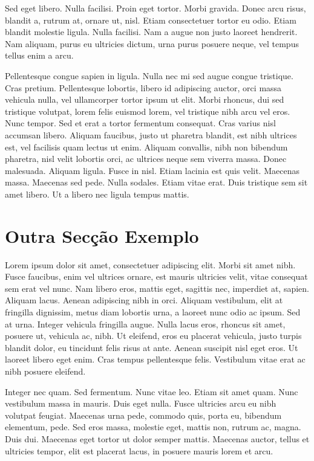 Sed eget libero. Nulla facilisi. Proin eget tortor. Morbi
gravida. Donec arcu risus, blandit a, rutrum at, ornare ut,
nisl. Etiam consectetuer tortor eu odio. Etiam blandit molestie
ligula. Nulla facilisi. Nam a augue non justo laoreet hendrerit. Nam
aliquam, purus eu ultricies dictum, urna purus posuere neque, vel
tempus tellus enim a arcu. 

Pellentesque congue sapien in ligula. Nulla nec mi sed augue congue
tristique. Cras pretium. Pellentesque lobortis, libero id adipiscing
auctor, orci massa vehicula nulla, vel ullamcorper tortor ipsum ut
elit. Morbi rhoncus, dui sed tristique volutpat, lorem felis euismod
lorem, vel tristique nibh arcu vel eros. Nunc tempor. Sed et erat a
tortor fermentum consequat. Cras varius nisl accumsan libero. Aliquam
faucibus, justo ut pharetra blandit, est nibh ultrices est, vel
facilisis quam lectus ut enim. Aliquam convallis, nibh non bibendum
pharetra, nisl velit lobortis orci, ac ultrices neque sem viverra
massa. Donec malesuada. Aliquam ligula. Fusce in nisl. Etiam lacinia
est quis velit. Maecenas massa. Maecenas sed pede. Nulla
sodales. Etiam vitae erat. Duis tristique sem sit amet libero. Ut a
libero nec ligula tempus mattis. 

\section{Outra Secção Exemplo} \label{sec:goals}

Lorem ipsum dolor sit amet, consectetuer adipiscing elit. Morbi sit
amet nibh. Fusce faucibus, enim vel ultrices ornare, est mauris
ultricies velit, vitae consequat sem erat vel nunc. Nam libero eros,
mattis eget, sagittis nec, imperdiet at, sapien. Aliquam lacus. Aenean
adipiscing nibh in orci. Aliquam vestibulum, elit at fringilla
dignissim, metus diam lobortis urna, a laoreet nunc odio ac ipsum. Sed
at urna. Integer vehicula fringilla augue. Nulla lacus eros, rhoncus
sit amet, posuere ut, vehicula ac, nibh. Ut eleifend, eros eu placerat
vehicula, justo turpis blandit dolor, eu tincidunt felis risus at
ante. Aenean suscipit nisl eget eros. Ut laoreet libero eget
enim. Cras tempus pellentesque felis. Vestibulum vitae erat ac nibh
posuere eleifend. 

Integer nec quam. Sed fermentum. Nunc vitae leo. Etiam sit amet
quam. Nunc vestibulum massa in mauris. Duis eget nulla. Fusce
ultricies arcu eu nibh volutpat feugiat. Maecenas urna pede, commodo
quis, porta eu, bibendum elementum, pede. Sed eros massa, molestie
eget, mattis non, rutrum ac, magna. Duis dui. Maecenas eget tortor ut
dolor semper mattis. Maecenas auctor, tellus et ultricies tempor, elit
est placerat lacus, in posuere mauris lorem et arcu. 


